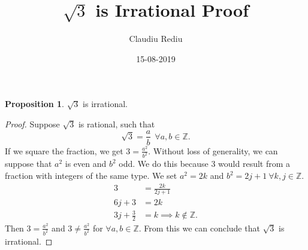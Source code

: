 \documentclass[11pt, a4paper]{article}
\title{{$\sqrt{3}$ is Irrational Proof}}
\date{15-08-2019}
\author{Claudiu Rediu}
\theoremstyle{definition}
\theoremstyle{theorem}
\newtheorem*{theorem}{Proposition}
\begin{document}
	\maketitle
	\newpage
	\newpage
	\begin{theorem}
		$\sqrt{3}$ is irrational.
	\end{theorem}

	\begin{proof}
	

		Suppose $\sqrt{3}$ is rational, such that $$\sqrt{3} = \frac{a}{b} \ \ \forall a,b \in\mathbb{Z}.$$
		If we square the fraction, we get $3 = \frac{a^2}{b^2}$.
		Without loss of generality, we can suppose that $a^2$ is even and $b^2$ odd. We do this because 3 would result from a fraction with integers of the same type. We set $a^2 = 2k$ and $b^2 = 2j+1 \ \forall k,j \in\mathbb{Z}$.
		\begin{equation}
		\begin{split}
		3 &= \frac{2k}{2j+1} \\
		6j+3 &= 2k \\
		3j + \frac{3}{2} &= k \implies k \notin\mathbb{Z}. 
		\end{split}
		\end{equation}
		Then $3 = \frac{a^2}{b^2}$ and $3 \ne \frac{a^2}{b^2}$ for $\forall a,b \in\mathbb{Z}$. From this we can conclude that $\sqrt{3}$ is irrational.
	\end{proof}
\end{document}
